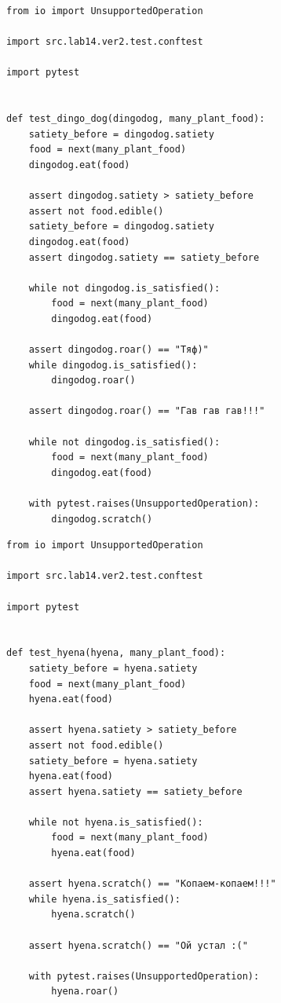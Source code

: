 \documentclass[a4paper,14pt]{extarticle}
\begin{document}
\begin{verbatim}
from io import UnsupportedOperation

import src.lab14.ver2.test.conftest

import pytest


def test_dingo_dog(dingodog, many_plant_food):
    satiety_before = dingodog.satiety
    food = next(many_plant_food)
    dingodog.eat(food)

    assert dingodog.satiety > satiety_before
    assert not food.edible()
    satiety_before = dingodog.satiety
    dingodog.eat(food)
    assert dingodog.satiety == satiety_before

    while not dingodog.is_satisfied():
        food = next(many_plant_food)
        dingodog.eat(food)

    assert dingodog.roar() == "Тяф)"
    while dingodog.is_satisfied():
        dingodog.roar()

    assert dingodog.roar() == "Гав гав гав!!!"

    while not dingodog.is_satisfied():
        food = next(many_plant_food)
        dingodog.eat(food)

    with pytest.raises(UnsupportedOperation):
        dingodog.scratch()
\end{verbatim}
\begin{verbatim}
from io import UnsupportedOperation

import src.lab14.ver2.test.conftest

import pytest


def test_hyena(hyena, many_plant_food):
    satiety_before = hyena.satiety
    food = next(many_plant_food)
    hyena.eat(food)

    assert hyena.satiety > satiety_before
    assert not food.edible()
    satiety_before = hyena.satiety
    hyena.eat(food)
    assert hyena.satiety == satiety_before

    while not hyena.is_satisfied():
        food = next(many_plant_food)
        hyena.eat(food)

    assert hyena.scratch() == "Копаем-копаем!!!"
    while hyena.is_satisfied():
        hyena.scratch()

    assert hyena.scratch() == "Ой устал :("

    with pytest.raises(UnsupportedOperation):
        hyena.roar()

\end{verbatim}
\end{document}
